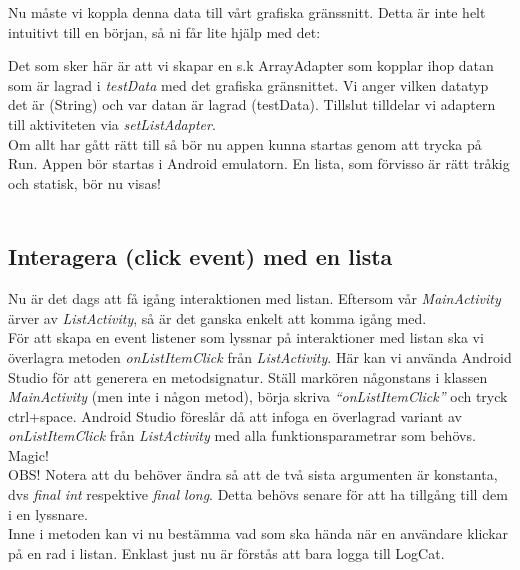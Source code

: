 \documentclass[11 pt, titlepage]{article} %
\begin{document}
Nu måste vi koppla denna data till vårt grafiska gränssnitt. Detta är inte helt intuitivt till en början, så ni får lite hjälp med det:

Det som sker här är att vi skapar en s.k ArrayAdapter som kopplar ihop datan som är lagrad i \textit{testData} med det grafiska gränsnittet.
Vi anger vilken datatyp det är (String) och var datan är lagrad (testData).
Tillslut tilldelar vi adaptern till aktiviteten via \textit{setListAdapter}.\\

Om allt har gått rätt till så bör nu appen kunna startas genom att trycka på Run. Appen bör startas i Android emulatorn. En lista, som förvisso är rätt tråkig och statisk, bör nu visas!\\ \\


\subsection{Interagera (click event) med en lista}
Nu är det dags att få igång interaktionen med listan.
Eftersom vår \textit{MainActivity} ärver av \textit{ListActivity}, så är det ganska enkelt att komma igång med.\\

För att skapa en event listener som lyssnar på interaktioner med listan ska vi överlagra metoden \textit{onListItemClick} från \textit{ListActivity}.
Här kan vi använda Android Studio för att generera en metodsignatur.
Ställ markören någonstans i klassen \textit{MainActivity} (men inte i någon metod), börja skriva \textit{“onListItemClick”} och tryck ctrl+space.
Android Studio föreslår då att infoga en överlagrad variant av \textit{onListItemClick} från \textit{ListActivity} med alla funktionsparametrar som behövs. Magic!\\

OBS! Notera att du behöver ändra så att de två sista argumenten är konstanta, dvs \textit{final int} respektive \textit{final long}.
Detta behövs senare för att ha tillgång till dem i en lyssnare.\\

Inne i metoden kan vi nu bestämma vad som ska hända när en användare klickar på en rad i listan.
Enklast just nu är förstås att bara logga till LogCat.\\
\end{document}
